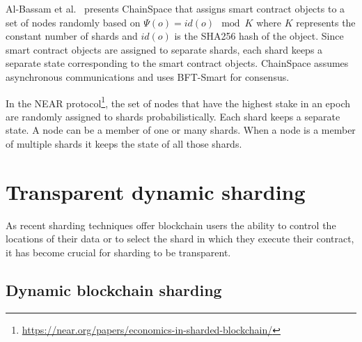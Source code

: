 \documentclass[11pt,dvipdfm]{article}
\newcommand{\deepal}[1]{\emph{Deepal: #1}}%
\begin{document}
Al-Bassam et al.~\cite{al2017chainspace} presents ChainSpace that assigns smart contract objects to a set of nodes randomly based on $\Psi(o) = id(o)\mod K$ where $K$ represents the constant number of shards and $id(o)$ is the \textsc{SHA256} hash of the object. Since smart contract objects are assigned to separate shards, each shard keeps a separate state corresponding to the smart contract objects. ChainSpace assumes asynchronous communications and uses BFT-Smart for consensus. 


In the NEAR protocol\footnote{\url{https://near.org/papers/economics-in-sharded-blockchain/}}, the set of nodes that have the highest stake in an epoch are randomly assigned to shards probabilistically. Each shard keeps a separate state. A node can be a member of one or many shards. When a node is a member of multiple shards it keeps the state of all those shards.



\section{Transparent dynamic sharding}\label{sec:transparent}

As recent sharding techniques offer blockchain users the ability to control the locations 
of their data or to select the shard in which they execute their contract, it has become crucial for sharding to be transparent.

\subsection{Dynamic blockchain sharding}
\end{document}
